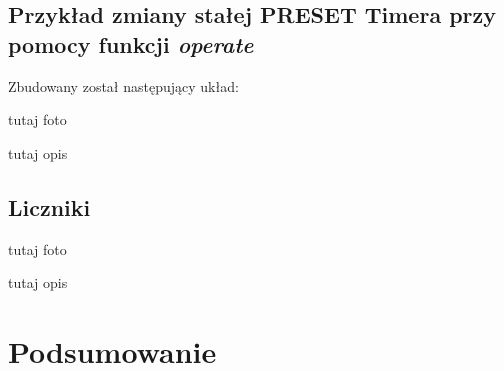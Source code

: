 \documentclass[12pt]{article}
\begin{document}
\subsection{Przykład zmiany stałej PRESET Timera przy pomocy funkcji \textit{operate}}

Zbudowany został następujący układ:

\colorbox{WildStrawberry}{tutaj foto}

\colorbox{WildStrawberry}{tutaj opis}


\subsection{Liczniki}

\colorbox{WildStrawberry}{tutaj foto}

\colorbox{WildStrawberry}{tutaj opis}

\section{Podsumowanie}
\end{document}
